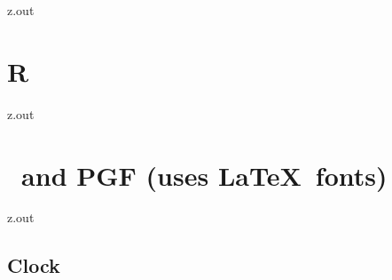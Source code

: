 \MyIO


\begin{VerbatimOut}{z.out}

\section{R}
\end{VerbatimOut}

\MyIOT


\begin{VerbatimOut}{z.out}

\section{\TikZ\ and PGF (uses \LaTeX\ fonts)}
\end{VerbatimOut}

\MyIOT


\begin{VerbatimOut}{z.out}

\subsection{Clock}
\end{VerbatimOut}

\MyIOT


